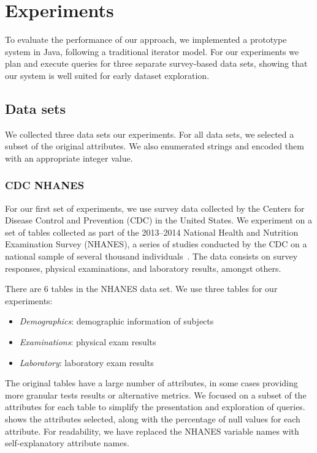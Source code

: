 \newcommand{\demorows}{10175}
\newcommand{\labexrows}{9813}

\section{Experiments}\label{sec:experiments}
To evaluate the performance of our approach,  we implemented
a prototype system in Java, following a traditional iterator model.
For our experiments we plan and execute queries
for three separate survey-based data sets, showing that our system
is well suited for early dataset exploration.

\subsection{Data sets} \label{subsec:datasets}
We collected three data sets our experiments.
For all data sets, we selected a subset of the original attributes.
We also enumerated strings and encoded them with an appropriate integer value.

\subsubsection{CDC NHANES}
For our first set of experiments, we use survey data collected by the 
Centers for Disease Control and Prevention (CDC) in the United States. We
experiment on a set of tables collected as part of the 2013--2014 National
Health and Nutrition Examination Survey (NHANES), a series of studies
conducted by the CDC on a national sample of several thousand individuals~\cite{cdc-data}.
The data consists on survey responses, physical examinations, and laboratory
results, amongst others.

There are 6 tables in the NHANES data set. We use three tables for our experiments:

\begin{itemize}
	\item \emph{Demographics}: demographic information of subjects
	\item \emph{Examinations}: physical exam results
	\item \emph{Laboratory}: laboratory exam results
\end{itemize}

The original tables have a large number of attributes, in some cases providing more granular tests results or alternative metrics.
We focused on a subset of the attributes for each table to simplify the presentation and exploration of queries.
 shows the attributes selected, along with the percentage of null values for each attribute.
For readability, we have replaced the NHANES variable names with self-explanatory attribute names.

